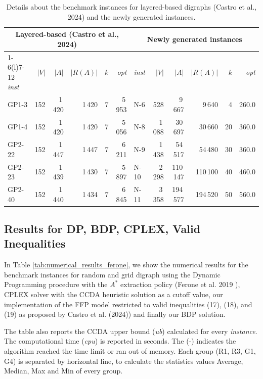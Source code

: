 \documentclass[pdflatex,sn-mathphys-num]{sn-jnl}
\begin{document}
\begin{table}[htbp]
\caption{Details about the benchmark instances for layered-based digraphs (Castro et al., 2024) and the newly generated instances.}
\label{tab:unified-instances}
\small
\setlength{\tabcolsep}{6pt}
\begin{tabular}{lrrrrr@{\hspace{12pt}}lrrrrr}
\toprule
\multicolumn{6}{c}{Layered-based (Castro et al., 2024)} & \multicolumn{6}{c}{Newly generated instances} \\
\cmidrule(r){1-6}\cmidrule(l){7-12}
\textit{inst} & $|V|$ & $|A|$ & $|R(A)|$ & $k$ & \textit{opt} & 
\textit{inst} & $|V|$ & $|A|$ & $|R(A)|$ & $k$ & \textit{opt} \\
\midrule
GP1-3  & 152 & 1\,420 & 1\,420 & 7 & 5\,953 &  N-6 &   528 &   9\,667 &   9\,640 &  4 & 260.0 \\
GP1-4  & 152 & 1\,420 & 1\,420 & 7 & 5\,056 &  N-8 & 1\,088 &  30\,697 &  30\,660 & 20 & 360.0 \\
GP2-22 & 152 & 1\,447 & 1\,447 & 7 & 6\,211 &  N-9 & 1\,438 &  54\,517 &  54\,480 & 30 & 360.0 \\
GP2-23 & 152 & 1\,439 & 1\,430 & 7 & 5\,897 &  N-10 & 2\,298 & 110\,147 & 110\,100 & 40 & 460.0 \\
GP2-40 & 152 & 1\,440 & 1\,434 & 7 & 6\,845 & N-11 & 3\,358 & 194\,577 & 194\,520 & 50 & 560.0 \\
\bottomrule
\end{tabular}
\end{table}

\subsection{Results for DP, BDP, CPLEX, Valid Inequalities}

In Table \ref{tab:numerical_results_ferone}, we show the numerical results for the benchmark instances for random and grid digraph using the Dynamic Programming procedure with the $A^*$ extraction policy (Ferone et al. 2019 \cite{Ferone2021}), 
CPLEX solver with the CCDA \cite{CerroneRusso2023} heuristic solution
as a cutoff value, our implementation of the FFP model restricted to valid inequalities (17), (18), and (19) as proposed by Castro et al. (2024)\cite{Castro2024}) and finally our BDP solution.

The table also reports the CCDA upper bound (\textit{ub}) calculated for every \textit{instance}. The computational time (\textit{cpu}) is reported in seconds.
The (-) indicates the algorithm reached the time limit or ran out of memory.
Each group (R1, R3, G1, G4) is separated by horizontal line, to calculate the statistics values Average, Median, Max and Min of every group.
\end{document}
